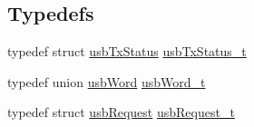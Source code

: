 \subsection*{Typedefs}
\begin{DoxyCompactItemize}
\item 
typedef struct \hyperlink{structusb_tx_status}{usb\-Tx\-Status} \hyperlink{mhvlib-_vusb-_keyboard_2vusb_2usbdrv_8h_ae6a25e02d49899e1862aa987a6c09ade}{usb\-Tx\-Status\-\_\-t}
\item 
typedef union \hyperlink{unionusb_word}{usb\-Word} \hyperlink{mhvlib-_vusb-_keyboard_2vusb_2usbdrv_8h_a992d37ca7c2980c180e963d4f78a30ea}{usb\-Word\-\_\-t}
\item 
typedef struct \hyperlink{structusb_request}{usb\-Request} \hyperlink{mhvlib-_vusb-_keyboard_2vusb_2usbdrv_8h_afc46c8aeec21279368fa6147d3880564}{usb\-Request\-\_\-t}
\end{DoxyCompactItemize}
